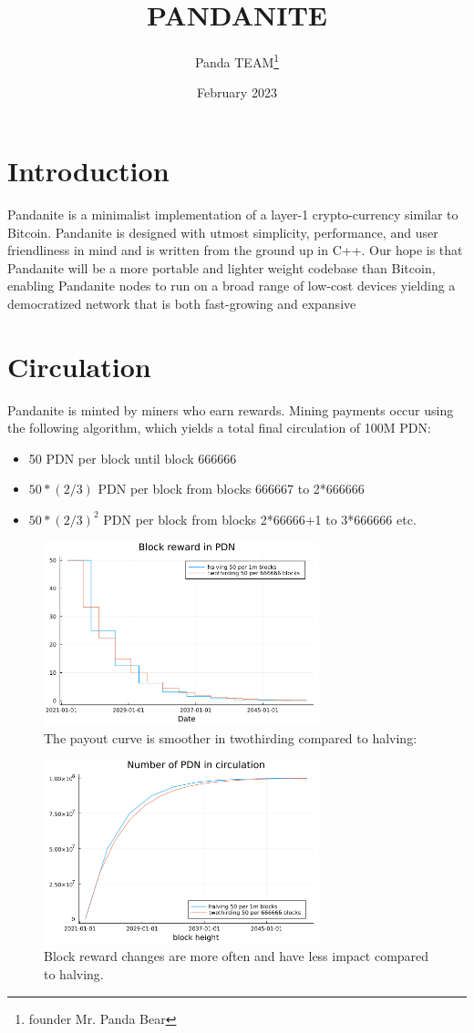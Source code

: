 \documentclass[11pt, a4paper]{elegantpaper}
\title{PANDANITE}
\author{Panda TEAM\thanks{founder Mr. Panda Bear}}
\date{February 2023}
\begin{document}
\maketitle

\section{Introduction}
Pandanite is a minimalist implementation of a layer-1 crypto-currency similar to Bitcoin. Pandanite is
designed with utmost simplicity, performance, and user friendliness in mind and is written from the
ground up in C++. Our hope is that Pandanite will be a more portable and lighter weight codebase
than Bitcoin, enabling Pandanite nodes to run on a broad range of low-cost devices yielding a
democratized network that is both fast-growing and expansive
\section{Circulation}
Pandanite is minted by miners who earn rewards. Mining payments occur using the following
algorithm, which yields a total final circulation of 100M PDN:
\begin{itemize}
	\item 50 PDN per block until block 666666
	\item $50*(2/3)$ PDN per block from blocks 666667 to 2*666666
	\item $50*(2/3)^2$ PDN per block from blocks 2*66666+1 to 3*666666 etc.
\end{itemize}
\begin{figure}[!h]
\includegraphics[width=8cm]{reward}
\centering
\caption{The payout curve is smoother in twothirding compared to halving:}
\end{figure}
\begin{figure}[!t]
\includegraphics[width=8cm]{circulation}
\centering
\caption{Block reward changes are more often and have less impact compared to halving.}
\end{figure}
\end{document}
